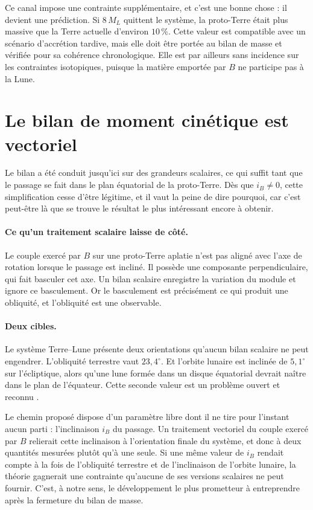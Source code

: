 \documentclass[11pt,a4paper,openany]{report}
\begin{document}
\begin{controle}
Ce canal impose une contrainte supplémentaire, et c'est une bonne chose : il devient une prédiction.
Si $8\,M_L$ quittent le système, la proto-Terre était plus massive que la Terre actuelle d'environ
$10\,\%$. Cette valeur est compatible avec un scénario d'accrétion tardive, mais elle doit être
portée au bilan de masse et vérifiée pour sa cohérence chronologique. Elle est par ailleurs sans
incidence sur les contraintes isotopiques, puisque la matière emportée par $B$ ne participe pas à
la Lune.
\end{controle}


\section{Le bilan de moment cinétique est vectoriel}
\label{sec:vectoriel}

Le bilan a été conduit jusqu'ici sur des grandeurs scalaires, ce qui suffit tant que le passage se
fait dans le plan équatorial de la proto-Terre. Dès que $i_B\ne0$, cette simplification cesse d'être
légitime, et il vaut la peine de dire pourquoi, car c'est peut-être là que se trouve le résultat le
plus intéressant encore à obtenir.

\paragraph{Ce qu'un traitement scalaire laisse de côté.} Le couple exercé par $B$ sur une
proto-Terre aplatie n'est pas aligné avec l'axe de rotation lorsque le passage est incliné. Il
possède une composante perpendiculaire, qui fait basculer cet axe. Un bilan scalaire enregistre la
variation du module et ignore ce basculement. Or le basculement est précisément ce qui produit une
obliquité, et l'obliquité est une observable.

\paragraph{Deux cibles.} Le système Terre--Lune présente deux orientations qu'aucun bilan scalaire
ne peut engendrer. L'obliquité terrestre vaut $23{,}4^\circ$. Et l'orbite lunaire est inclinée de
$5{,}1^\circ$ sur l'écliptique, alors qu'une lune formée dans un disque équatorial devrait naître
dans le plan de l'équateur. Cette seconde valeur est un problème ouvert et reconnu
\cite{PahlevanMorbidelli2015}.

\begin{ideephys}
Le chemin proposé dispose d'un paramètre libre dont il ne tire pour l'instant aucun parti :
l'inclinaison $i_B$ du passage. Un traitement vectoriel du couple exercé par $B$ relierait cette
inclinaison à l'orientation finale du système, et donc à deux quantités mesurées plutôt qu'à une
seule. Si une même valeur de $i_B$ rendait compte à la fois de l'obliquité terrestre et de
l'inclinaison de l'orbite lunaire, la théorie gagnerait une contrainte qu'aucune de ses versions
scalaires ne peut fournir. C'est, à notre sens, le développement le plus prometteur à entreprendre
après la fermeture du bilan de masse.
\end{ideephys}
\end{document}
